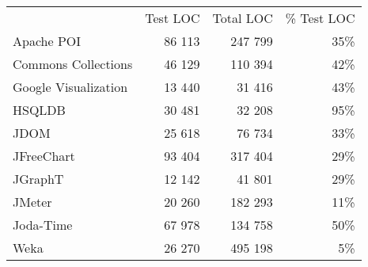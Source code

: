 \begin{tabular}{lrrr}
& Test LOC & Total LOC & \% Test LOC    \\
Apache POI &  86 113 & 247 799 & 35\% \\
Commons Collections &  46 129 & 110 394 & 42\% \\
Google Visualization & 13 440 & 31 416 & 43\% \\
HSQLDB &  30 481 & 32 208 & 95\% \\
JDOM &  25 618 & 76 734 & 33\% \\
JFreeChart &  93 404 & 317 404 & 29\% \\
JGraphT &  12 142 & 41 801 & 29\% \\
JMeter &  20 260 & 182 293 & 11\%\\
Joda-Time &  67 978 & 134 758 & 50\% \\
Weka & 26 270 & 495 198 & 5\% \\
\end{tabular}
